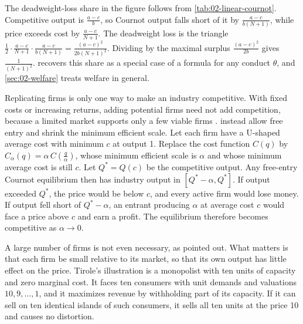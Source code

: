 The deadweight-loss share in the figure follows from \cref{tab:02-linear-cournot}. Competitive output is
$\frac{a - c}{b}$, so Cournot output falls short of it by $\frac{a - c}{b(N + 1)}$, while price exceeds cost by
$\frac{a - c}{N + 1}$. The deadweight loss is the triangle $\frac{1}{2}\cdot\frac{a - c}{N + 1}\cdot\frac{a -
c}{b(N + 1)} = \frac{(a - c)^2}{2b(N + 1)^2}$. Dividing by the maximal surplus $\frac{(a - c)^2}{2b}$ gives
$\frac{1}{(N + 1)^2}$.  recovers this share as a special case of a formula for any conduct
$\theta$, and \cref{sec:02-welfare} treats welfare in general.

\begin{remark}\label{rem:02-limits}
Replicating firms is only one way to make an industry competitive. With fixed costs or increasing returns, adding
potential firms need not add competition, because a limited market supports only a few viable firms
\citep[sec.~5.7.1.3]{Tirole1988}. \citet{NovshekSonnenschein1978} instead allow free entry and shrink the minimum
efficient scale. Let each firm have a U-shaped average cost with minimum $c$ at output 1. Replace the cost function
$C(q)$ by $C_\alpha(q) = \alpha\, C\left(\frac{q}{\alpha}\right)$, whose minimum efficient scale is $\alpha$ and whose
minimum average cost is still $c$. Let $Q^* = Q(c)$ be the competitive output. Any free-entry Cournot equilibrium then
has industry output in $[Q^* - \alpha, Q^*]$. If output exceeded $Q^*$, the price would be below $c$, and every active
firm would lose money. If output fell short of $Q^* - \alpha$, an entrant producing $\alpha$ at average cost $c$ would
face a price above $c$ and earn a profit. The equilibrium therefore becomes competitive as $\alpha \to 0$.

A large number of firms is not even necessary, as \citet{Hart1979} pointed out. What matters is that each firm be
small relative to its market, so that its own output has little effect on the price. Tirole's illustration is a
monopolist with ten units of capacity and zero marginal cost. It faces ten consumers with
unit demands and valuations $10, 9, \dots, 1$, and it maximizes revenue by withholding part of its capacity. If it can
sell on ten identical islands of such consumers, it sells all ten units at the price 10 and causes no distortion.
\end{remark}

